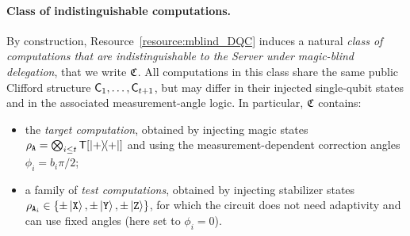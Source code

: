 \paragraph{Class of indistinguishable computations.}
By construction, Resource~\ref{resource:mblind_DQC} induces a natural \textit{class of computations that are indistinguishable to the Server under magic-blind delegation}, that we write $\mathfrak C$.
All computations in this class share the same public Clifford structure $\mathsf{C}_1,\ldots,\mathsf{C}_{t+1}$, but may differ in their injected single-qubit states and in the associated measurement-angle logic.
In particular, $\mathfrak C$ contains:
\begin{itemize}
    \item the \emph{target computation}, obtained by injecting magic states
    $\rho_{\mathtt{A}}=\bigotimes_{i\leq t}\mathsf{T}[\ketbra{+}]$ and using the measurement-dependent correction
    angles $\phi_i=b_i\pi/2$;
    \item a family of \emph{test computations}, obtained by injecting stabilizer states
    $\rho_{\mathtt{A}_i}\in\{\pm\ket {\mathtt{X}},\pm\ket {\mathtt{Y}},\pm\ket {\mathtt{Z}}\}$, for which the circuit does not need adaptivity and can use fixed angles
    (here set to $\phi_i=0$).
\end{itemize}

